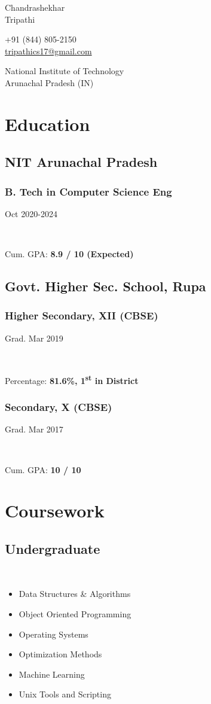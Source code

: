 \documentclass[]{article}
\newcommand{\namesection}[3]{
  \begin{multicols}{2}
    \begin{flushleft}
      \fontsize{30pt}{25pt}
      \fontspec[Path = fonts/ZillaSlab/]{ZillaSlab-Light}
      {{ #1 }\\{ #2 }}
      \columnbreak\\
    \end{flushleft}
    \begin{flushright}
      { #3 }
    \end{flushright}
  \end{multicols}
  \vspace{-10pt}
}
\newcommand{\subheading}[2]{
  {\subsection{#1}
  \hfill{#2}}\\
  \vspace{2pt}
}
\newcommand{\subsubheading}[2]{
  {\subsubsection{#1}
  \hfill \small#2} \\
  \vspace{2pt}
}
\newenvironment{tightemize}{
\vspace{-\topsep}\begin{itemize}\itemsep1pt \parskip0pt \parsep0pt}
{\end{itemize}\vspace{-\topsep}}
\begin{document}
\namesection{Chandrashekhar}{Tripathi}{+91 (844) 805-2150\\
  \href{mailto:tripathics17@gmail.com}{tripathics17@gmail.com}
  \par
  National Institute of Technology\\
  Arunachal Pradesh (IN)}

\noindent\makebox[\linewidth]{\color{light}\rule{\paperwidth}{0.2pt}}
\vspace{-15pt}

\begin{multicols}{2}
  \begin{flushleft}
    \section{Education}    
    \subsection{NIT Arunachal Pradesh}
    \subsubheading{B. Tech in Computer Science Eng}{Oct 2020-2024}
    Cum. GPA: \textbf{8.9 / 10 (Expected)}

    \subsection{Govt. Higher Sec. School, Rupa}
    \subsubheading{Higher Secondary, XII (CBSE)}{Grad. Mar 2019}
    Percentage: \textbf{81.6\%, 1\textsuperscript{st} in District}

    \subsubheading{Secondary, X (CBSE)}{Grad. Mar 2017}
    Cum. GPA: \textbf{10 / 10}
    
    
    \section{Coursework}
    \subheading{Undergraduate}{}
    \begin{tightemize}
      \item Data Structures \& Algorithms
      \item Object Oriented Programming
      \item Operating Systems
      \item Optimization Methods
      \item Machine Learning
      \item Unix Tools and Scripting
    \end{tightemize}


\end{flushleft}
\end{multicols}
\end{document}
